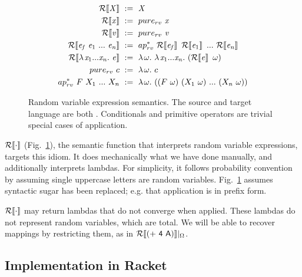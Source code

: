 \begin{figure}[tb]
\centering
\begin{equation*}
\begin{aligned}
	\RV{\mathit{X}} &\ :=\ \mathit{X} \\
	\RV{\mathit{x}} &\ :=\ \purerv~\mathit{x} \\
	\RV{\mathit{v}} &\ :=\ \purerv~\mathit{v} \\
	\RV{\mathit{e_f}~\mathit{e}_1~\dots~\mathit{e_n}}
		&\ :=\ \applyrv~\RV{\mathit{e_f}}~\RV{\mathit{e}_1}~\dots~\RV{\mathit{e_n}} \\
	\RV{\fun {\mathit{x}_1 \dots \mathit{x_n}} \mathit{e}}
		&\ :=\ \fun \omega {\fun {\mathit{x}_1 \dots \mathit{x_n}}(\RV{\mathit{e}}~\omega)} \\
	\app \purerv c &\ :=\ \fun \omega c \\
	\appppp \applyrv F {X_1} \dots {X_n}
		&\ :=\ \fun \omega {\papppp {\papp F \omega} {\papp {X_1} \omega} \dots {\papp {X_n} \omega}}
\end{aligned}
\end{equation*}
\hrulefill
\caption[Random variable expression semantics]{Random variable expression semantics. The source and target language are both \targetlang. Conditionals and primitive operators are trivial special cases of application.}
\label{fig:rv}
\end{figure}

$\mathcal{R}\!\left\llbracket{\cdot}\right\rrbracket$ (Fig.~\ref{fig:rv}), the semantic function that interprets random variable expressions, targets this idiom. It does mechanically what we have done manually, and additionally interprets lambdas. For simplicity, it follows probability convention by assuming single uppercase letters are random variables. Fig.~\ref{fig:rv} assumes syntactic sugar has been replaced; e.g. that application is in prefix form.

$\mathcal{R}\!\left\llbracket{\cdot}\right\rrbracket$ may return lambdas that do not converge when applied. These lambdas do not represent random variables, which are total. We will be able to recover mappings by restricting them, as in ${\mathcal{R}\!\left\llbracket{\mathsf{\left({+}\ {4}\ {A}\right)}}\right\rrbracket}\lvert_{\Omega}$.

\subsection{Implementation in Racket}

